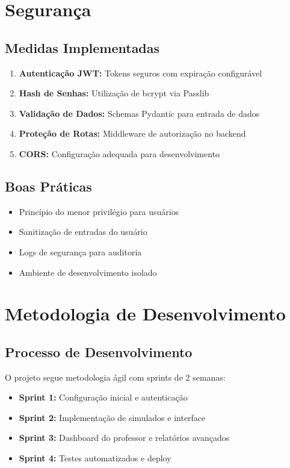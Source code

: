 \documentclass[12pt,a4paper]{article}
\begin{document}
\section{Segurança}

\subsection{Medidas Implementadas}
\begin{enumerate}
    \item \textbf{Autenticação JWT:} Tokens seguros com expiração configurável
    \item \textbf{Hash de Senhas:} Utilização de bcrypt via Passlib
    \item \textbf{Validação de Dados:} Schemas Pydantic para entrada de dados
    \item \textbf{Proteção de Rotas:} Middleware de autorização no backend
    \item \textbf{CORS:} Configuração adequada para desenvolvimento
\end{enumerate}

\subsection{Boas Práticas}
\begin{itemize}
    \item Princípio do menor privilégio para usuários
    \item Sanitização de entradas do usuário
    \item Logs de segurança para auditoria
    \item Ambiente de desenvolvimento isolado
\end{itemize}

\section{Metodologia de Desenvolvimento}

\subsection{Processo de Desenvolvimento}
O projeto segue metodologia ágil com sprints de 2 semanas:

\begin{itemize}
    \item \textbf{Sprint 1:} Configuração inicial e autenticação
    \item \textbf{Sprint 2:} Implementação de simulados e interface
    \item \textbf{Sprint 3:} Dashboard do professor e relatórios avançados
    \item \textbf{Sprint 4:} Testes automatizados e deploy
\end{itemize}
\end{document}
